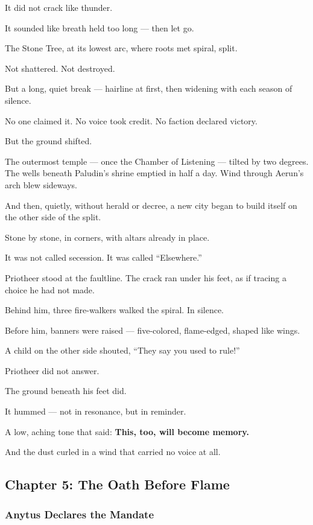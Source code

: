 \documentclass[12pt]{article}
\begin{document}
It did not crack like thunder.

It sounded like breath held too long —  
then let go.

The Stone Tree, at its lowest arc,  
where roots met spiral,  
split.

Not shattered. Not destroyed.

But a long, quiet break —  
hairline at first,  
then widening with each season of silence.

No one claimed it.  
No voice took credit.  
No faction declared victory.

But the ground shifted.

The outermost temple — once the Chamber of Listening — tilted by two degrees.  
The wells beneath Paludin’s shrine emptied in half a day.  
Wind through Aerun’s arch blew sideways.

And then, quietly, without herald or decree,  
a new city began to build itself on the other side of the split.

Stone by stone,  
in corners,  
with altars already in place.

It was not called secession.  
It was called “Elsewhere.”

Priotheer stood at the faultline.  
The crack ran under his feet,  
as if tracing a choice he had not made.

Behind him, three fire-walkers walked the spiral.  
In silence.

Before him, banners were raised —  
five-colored, flame-edged, shaped like wings.

A child on the other side shouted,  
 “They say you used to rule!”

Priotheer did not answer.

The ground beneath his feet did.

It hummed —  
not in resonance,  
but in reminder.

A low, aching tone  
that said:  
 \textbf{This, too, will become memory.}

And the dust curled in a wind  
that carried no voice at all.

\newpage

\subsection*{Chapter 5: The Oath Before Flame}

\vspace{.5in}

\subsubsection*{Anytus Declares the Mandate}
\end{document}
